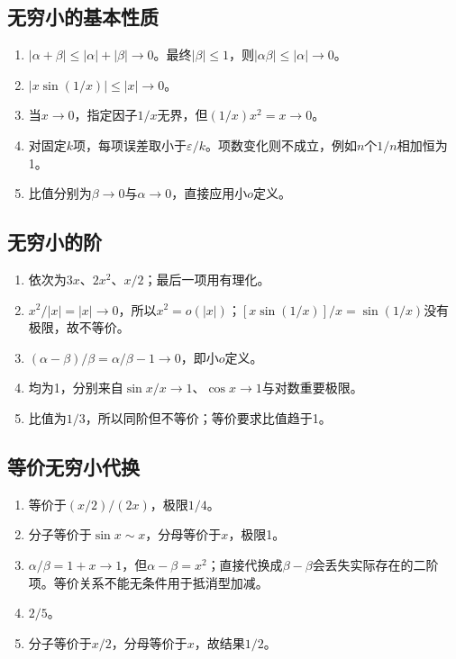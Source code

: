\documentclass[11pt,a4paper,fontset=fandol]{ctexrep}
\begin{document}
\subsection{无穷小的基本性质}
\begin{enumerate}
\item $|\alpha+\beta|\le|\alpha|+|\beta|\to0$。最终$|\beta|\le1$，则$|\alpha\beta|\le|\alpha|\to0$。
\item $|x\sin(1/x)|\le|x|\to0$。
\item 当$x\to0$，指定因子$1/x$无界，但$(1/x)x^2=x\to0$。
\item 对固定$k$项，每项误差取小于$\varepsilon/k$。项数变化则不成立，例如$n$个$1/n$相加恒为1。
\item 比值分别为$\beta\to0$与$\alpha\to0$，直接应用小$o$定义。
\end{enumerate}
\subsection{无穷小的阶}
\begin{enumerate}
\item 依次为$3x$、$2x^2$、$x/2$；最后一项用有理化。
\item $x^2/|x|=|x|\to0$，所以$x^2=o(|x|)$；$[x\sin(1/x)]/x=\sin(1/x)$没有极限，故不等价。
\item $(\alpha-\beta)/\beta=\alpha/\beta-1\to0$，即小$o$定义。
\item 均为1，分别来自$\sin x/x\to1$、$\cos x\to1$与对数重要极限。
\item 比值为$1/3$，所以同阶但不等价；等价要求比值趋于1。
\end{enumerate}
\subsection{等价无穷小代换}
\begin{enumerate}
\item 等价于$(x/2)/(2x)$，极限$1/4$。
\item 分子等价于$\sin x\sim x$，分母等价于$x$，极限1。
\item $\alpha/\beta=1+x\to1$，但$\alpha-\beta=x^2$；直接代换成$\beta-\beta$会丢失实际存在的二阶项。等价关系不能无条件用于抵消型加减。
\item $2/5$。
\item 分子等价于$x/2$，分母等价于$x$，故结果$1/2$。
\end{enumerate}
\end{document}
